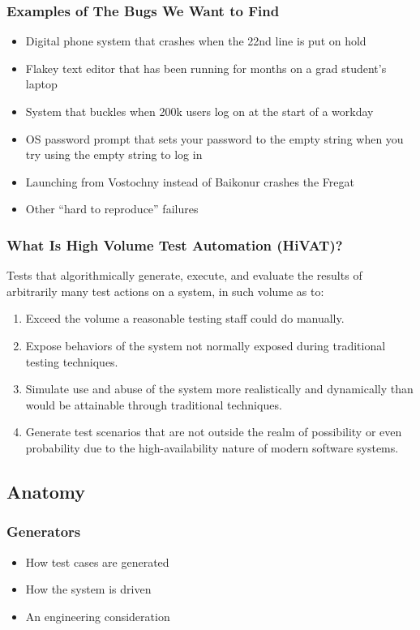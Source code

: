 \begin{frame}
  \frametitle{Examples of The Bugs We Want to Find}
  \begin{itemize}
    \item Digital phone system that crashes when the 22nd line is put on hold
    \item Flakey text editor that has been running for months on a grad student's laptop
    \item System that buckles when 200k users log on at the start of a workday
    \item OS password prompt that sets your password to the empty string when you try using the empty string to log in
    \item Launching from Vostochny instead of Baikonur crashes the Fregat
    \item Other ``hard to reproduce'' failures
  \end{itemize}
\end{frame}

\begin{frame}
  \frametitle{What Is High Volume Test Automation (HiVAT)?}
  Tests that algorithmically generate, execute, and evaluate the results of arbitrarily many test actions on a system, in such volume as to:\citep{KanerHivatOverview}
  \begin{enumerate}
  \item Exceed the volume a reasonable testing staff could do manually.
  \item Expose behaviors of the system not normally exposed during traditional testing techniques.
  \item Simulate use and abuse of the system more realistically and dynamically than would be attainable through traditional techniques.
  \item Generate test scenarios that are not outside the realm of possibility or even probability due to the high-availability nature of modern software systems.
\end{enumerate}
\end{frame}

\subsection{Anatomy}

\begin{frame}
  \frametitle{Generators}
  \begin{itemize}
    \item How test cases are generated
    \item How the system is driven
    \item An engineering consideration
  \end{itemize}
\end{frame}

